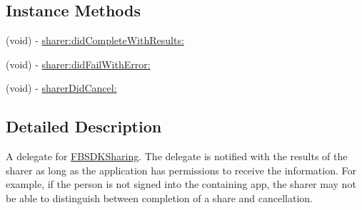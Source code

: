 \subsection*{Instance Methods}
\begin{DoxyCompactItemize}
\item 
(void) -\/ \hyperlink{protocol_f_b_s_d_k_sharing_delegate-p_a879c32e66bea7ef374862fb43e5028cc}{sharer\-:did\-Complete\-With\-Results\-:}
\item 
(void) -\/ \hyperlink{protocol_f_b_s_d_k_sharing_delegate-p_a87d7cd26c9915bf4142b041129fe18b7}{sharer\-:did\-Fail\-With\-Error\-:}
\item 
(void) -\/ \hyperlink{protocol_f_b_s_d_k_sharing_delegate-p_a0c1c22ef0c0d8622d124ad3daf777e9e}{sharer\-Did\-Cancel\-:}
\end{DoxyCompactItemize}


\subsection{Detailed Description}
A delegate for \hyperlink{protocol_f_b_s_d_k_sharing-p}{F\-B\-S\-D\-K\-Sharing}.  The delegate is notified with the results of the sharer as long as the application has permissions to receive the information. For example, if the person is not signed into the containing app, the sharer may not be able to distinguish between completion of a share and cancellation. 

